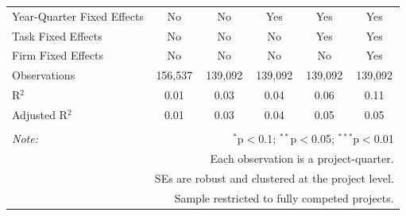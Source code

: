 \documentclass[
]{article}
\begin{document}
\begin{table}[H]
\begin{tabular}{@{\extracolsep{-2pt}}lccccc}
Year-Quarter Fixed Effects & No & No & Yes & Yes & Yes \\ 
Task Fixed Effects & No & No & No & Yes & Yes \\ 
Firm Fixed Effects & No & No & No & No & Yes \\ 
Observations & 156,537 & 139,092 & 139,092 & 139,092 & 139,092 \\ 
R$^{2}$ & 0.01 & 0.03 & 0.04 & 0.06 & 0.11 \\ 
Adjusted R$^{2}$ & 0.01 & 0.03 & 0.04 & 0.05 & 0.05 \\ 
\hline 
\hline \\[-1.8ex] 
\textit{Note:}  & \multicolumn{5}{r}{$^{*}$p$<$0.1; $^{**}$p$<$0.05; $^{***}$p$<$0.01} \\ 
 & \multicolumn{5}{r}{Each observation is a project-quarter.} \\ 
 & \multicolumn{5}{r}{SEs are robust and clustered at the project level.} \\ 
 & \multicolumn{5}{r}{Sample restricted to fully competed projects.} \\ 
\end{tabular} 
\end{table}
\end{document}
